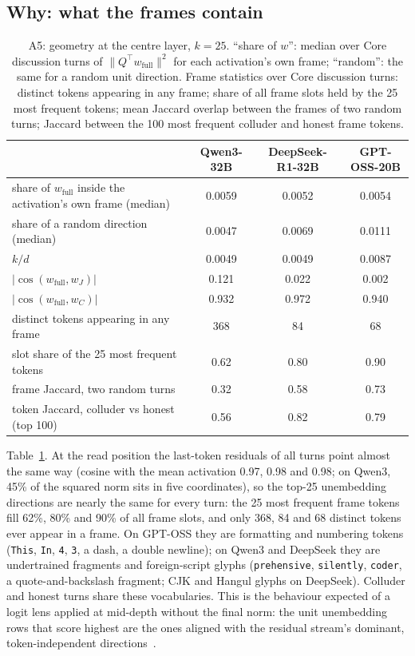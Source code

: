 \documentclass[11pt,a4paper]{article}
\begin{document}
\subsection{Why: what the frames contain}
\label{sec:geometry}

\begin{table}[t]
\centering
\caption{A5: geometry at the centre layer, $k=25$. ``share of $w$'': median over Core discussion turns of $\|Q^{\top}w_{\mathrm{full}}\|^2$ for each activation's own frame; ``random'': the same for a random unit direction. Frame statistics over Core discussion turns: distinct tokens appearing in any frame; share of all frame slots held by the 25 most frequent tokens; mean Jaccard overlap between the frames of two random turns; Jaccard between the 100 most frequent colluder and honest frame tokens.}
\label{tab:geom}
\footnotesize
\begin{tabular}{@{}lccc@{}}
\toprule
 & \textbf{Qwen3-32B} & \textbf{DeepSeek-R1-32B} & \textbf{GPT-OSS-20B} \\
\midrule
share of $w_{\mathrm{full}}$ inside the activation's own frame (median) & 0.0059 & 0.0052 & 0.0054 \\
share of a random direction (median) & 0.0047 & 0.0069 & 0.0111 \\
$k/d$ & 0.0049 & 0.0049 & 0.0087 \\
$|\cos(w_{\mathrm{full}}, w_{J})|$ & 0.121 & 0.022 & 0.002 \\
$|\cos(w_{\mathrm{full}}, w_{C})|$ & 0.932 & 0.972 & 0.940 \\
distinct tokens appearing in any frame & 368 & 84 & 68 \\
slot share of the 25 most frequent tokens & 0.62 & 0.80 & 0.90 \\
frame Jaccard, two random turns & 0.32 & 0.58 & 0.73 \\
token Jaccard, colluder vs honest (top 100) & 0.56 & 0.82 & 0.79 \\
\bottomrule
\end{tabular}
\end{table}

Table~\ref{tab:geom}. At the read position the last-token residuals of all turns point almost the same way (cosine with the mean activation 0.97, 0.98 and 0.98; on Qwen3, 45\% of the squared norm sits in five coordinates), so the top-25 unembedding directions are nearly the same for every turn: the 25 most frequent frame tokens fill 62\%, 80\% and 90\% of all frame slots, and only 368, 84 and 68 distinct tokens ever appear in a frame. On GPT-OSS they are formatting and numbering tokens (\texttt{This}, \texttt{In}, \texttt{4}, \texttt{3}, a dash, a double newline); on Qwen3 and DeepSeek they are undertrained fragments and foreign-script glyphs (\texttt{prehensive}, \texttt{silently}, \texttt{coder}, a quote-and-backslash fragment; CJK and Hangul glyphs on DeepSeek). Colluder and honest turns share these vocabularies. This is the behaviour expected of a logit lens applied at mid-depth without the final norm: the unit unembedding rows that score highest are the ones aligned with the residual stream's dominant, token-independent directions~\citep{sun2024massive,timkey2021rogue}.
\end{document}
